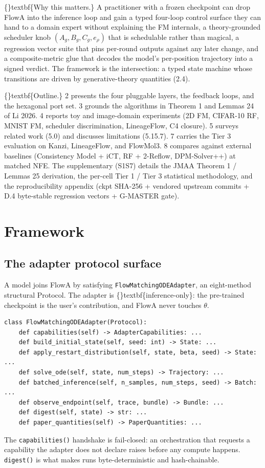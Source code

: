 \documentclass{article}
\begin{document}
\{\}textbf\{Why this matters.\} A practitioner with a frozen checkpoint can drop FlowA into the inference loop and gain a typed four-loop control surface they can hand to a domain expert without explaining the FM internals, a theory-grounded scheduler knob $(A_g, B_g, C_g, e_\rho)$ that is schedulable rather than magical, a regression vector suite that pins per-round outputs against any later change, and a composite-metric glue that decodes the model's per-position trajectory into a signed verdict. The framework is the intersection: a typed state machine whose transitions are driven by generative-theory quantities (2.4).

\{\}textbf\{Outline.\} 2 presents the four pluggable layers, the feedback loops, and the hexagonal port set. 3 grounds the algorithms in Theorem 1 and Lemmas 24 of Li 2026. 4 reports toy and image-domain experiments (2D FM, CIFAR-10 RF, MNIST FM, scheduler discrimination, LineageFlow, C4 closure). 5 surveys related work (5.0) and discusses limitations (5.15.7). 7 carries the Tier 3 evaluation on Kanzi, LineageFlow, and FlowMol3. 8 compares against external baselines (Consistency Model + iCT, RF + 2-Reflow, DPM-Solver++) at matched NFE. The supplementary (S1S7) details the JMAA Theorem 1 / Lemmas 25 derivation, the per-cell Tier 1 / Tier 3 statistical methodology, and the reproducibility appendix (ckpt SHA-256 + vendored upstream commits + D.4 byte-stable regression vectors + G-MASTER gate).

\section{Framework}
\subsection{The adapter protocol surface}
A model joins FlowA by satisfying \texttt{FlowMatchingODEAdapter}, an eight-method structural Protocol. The adapter is \{\}textbf\{inference-only\}: the pre-trained checkpoint is the user's contribution, and FlowA never touches $\theta$.

\begin{verbatim}
class FlowMatchingODEAdapter(Protocol):
    def capabilities(self) -> AdapterCapabilities: ...
    def build_initial_state(self, seed: int) -> State: ...
    def apply_restart_distribution(self, state, beta, seed) -> State: ...
    def solve_ode(self, state, num_steps) -> Trajectory: ...
    def batched_inference(self, n_samples, num_steps, seed) -> Batch: ...
    def observe_endpoint(self, trace, bundle) -> Bundle: ...
    def digest(self, state) -> str: ...
    def paper_quantities(self) -> PaperQuantities: ...
\end{verbatim}
The \texttt{capabilities()} handshake is fail-closed: an orchestration that requests a capability the adapter does not declare raises before any compute happens. \texttt{digest()} is what makes runs byte-deterministic and hash-chainable.
\end{document}

